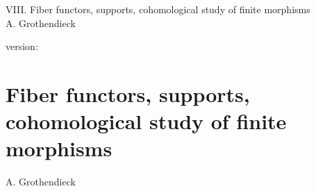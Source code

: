 \documentclass[10pt]{../fichiers-configuration-latex/smfart}
\begin{document}
\begin{center}
VIII. Fiber functors, supports, cohomological study of finite morphisms\\
A. Grothendieck
\end{center}

version: \showgitstatus
\tableofcontents

\else
\chapter{Fiber functors, supports, cohomological study of finite morphisms}
\begin{center}
A. Grothendieck
\end{center}
\fi
{}\label{sga4.exp.VIII}










\end{document}
